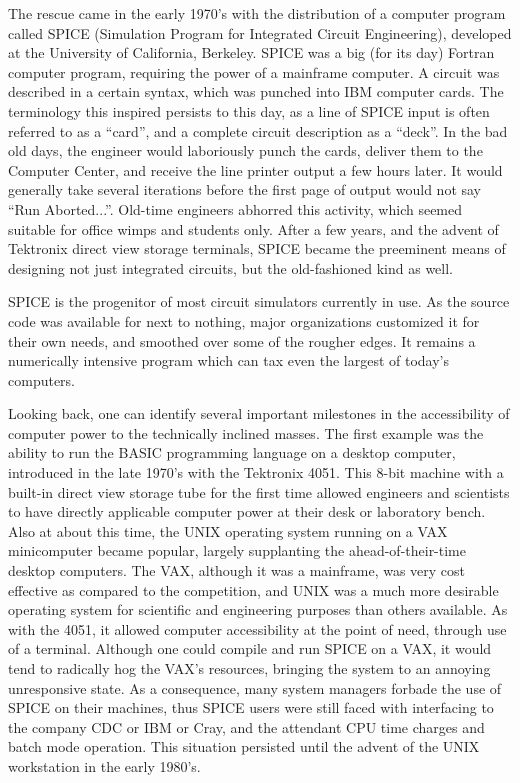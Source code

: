 The rescue came in the early 1970's with the distribution of a
computer program called SPICE (Simulation Program for Integrated
Circuit Engineering), developed at the University of California,
Berkeley.  SPICE was a big (for its day) Fortran computer program,
requiring the power of a mainframe computer.  A circuit was described
in a certain syntax, which was punched into IBM computer cards.  The
terminology this inspired persists to this day, as a line of SPICE
input is often referred to as a ``card'', and a complete circuit
description as a ``deck''.  In the bad old days, the engineer would
laboriously punch the cards, deliver them to the Computer Center, and
receive the line printer output a few hours later.  It would generally
take several iterations before the first page of output would not
say ``Run Aborted...''.  Old-time engineers abhorred this activity,
which seemed suitable for office wimps and students only.  After a few
years, and the advent of Tektronix direct view storage terminals,
SPICE became the preeminent means of designing not just integrated
circuits, but the old-fashioned kind as well.

SPICE is the progenitor of most circuit simulators currently in use.
As the source code was available for next to nothing, major
organizations customized it for their own needs, and smoothed over
some of the rougher edges.  It remains a numerically intensive program
which can tax even the largest of today's computers.

Looking back, one can identify several important milestones in the
accessibility of computer power to the technically inclined masses. 
The first example was the ability to run the BASIC programming
language on a desktop computer, introduced in the late 1970's with the
Tektronix 4051.  This 8-bit machine with a built-in direct view
storage tube for the first time allowed engineers and scientists to
have directly applicable computer power at their desk or laboratory
bench.  Also at about this time, the UNIX operating system running on
a VAX minicomputer became popular, largely supplanting the
ahead-of-their-time desktop computers.  The VAX, although it was a
mainframe, was very cost effective as compared to the competition, and
UNIX was a much more desirable operating system for scientific and
engineering purposes than others available.  As with the 4051, it
allowed computer accessibility at the point of need, through use of a
terminal.  Although one could compile and run SPICE on a VAX, it would
tend to radically hog the VAX's resources, bringing the system to an
annoying unresponsive state.  As a consequence, many system managers
forbade the use of SPICE on their machines, thus SPICE users were
still faced with interfacing to the company CDC or IBM or Cray, and
the attendant CPU time charges and batch mode operation.  This
situation persisted until the advent of the UNIX workstation in the
early 1980's.

